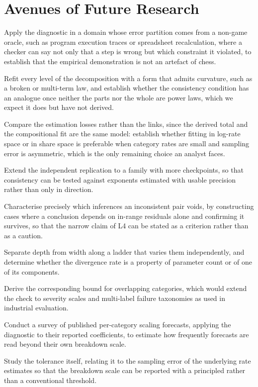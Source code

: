 \documentclass[11pt]{article}
\begin{document}
\section{Avenues of Future Research}
\label{sec:future}

\begin{description}[nosep,leftmargin=1.5em]
\item[FR1] Apply the diagnostic in a domain whose error partition comes from a
non-game oracle, such as program execution traces or spreadsheet recalculation,
where a checker can say not only that a step is wrong but which constraint it
violated, to establish that the empirical demonstration is not an artefact of chess.
\item[FR2] Refit every level of the decomposition with a form that admits
curvature, such as a broken or multi-term law, and establish whether the consistency
condition has an analogue once neither the parts nor the whole are power laws, which
we expect it does but have not derived.
\item[FR3] Compare the estimation losses rather than the links, since the derived
total and the compositional fit are the same model: establish whether fitting in
log-rate space or in share space is preferable when category rates are small and
sampling error is asymmetric, which is the only remaining choice an analyst faces.
\item[FR4] Extend the independent replication to a family with more checkpoints, so
that consistency can be tested against exponents estimated with usable precision
rather than only in direction.
\item[FR5] Characterise precisely which inferences an inconsistent pair voids, by
constructing cases where a conclusion depends on in-range residuals alone and
confirming it survives, so that the narrow claim of L4 can be stated as a criterion
rather than as a caution.
\item[FR6] Separate depth from width along a ladder that varies them independently,
and determine whether the divergence rate is a property of parameter count or of
one of its components.
\item[FR7] Derive the corresponding bound for overlapping categories, which would
extend the check to severity scales and multi-label failure taxonomies as used in
industrial evaluation.
\item[FR8] Conduct a survey of published per-category scaling forecasts, applying
the diagnostic to their reported coefficients, to estimate how frequently forecasts
are read beyond their own breakdown scale.
\item[FR9] Study the tolerance itself, relating it to the sampling error of the
underlying rate estimates so that the breakdown scale can be reported with a
principled rather than a conventional threshold.
\end{description}
\end{document}
